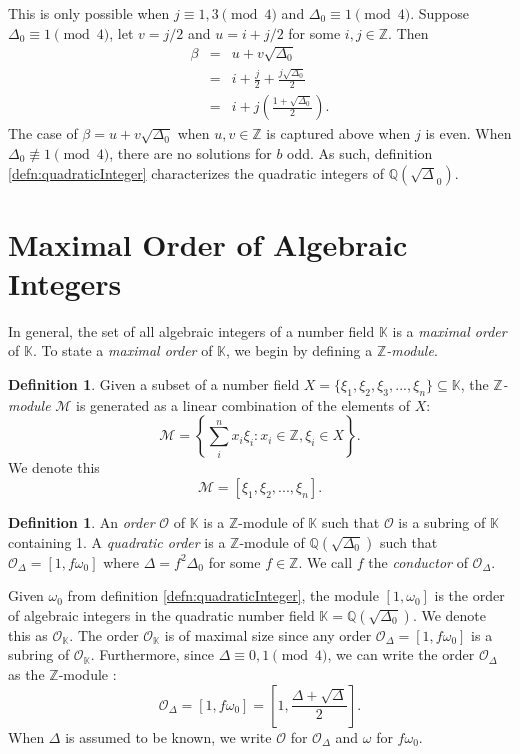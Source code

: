 \documentclass{ucalgthes1}
\theoremstyle{plain}
\theoremstyle{definition}
\newtheorem{defn}[thm]{Definition}
\newcommand{\KK}{\mathbb{K}}
\newcommand{\MM}{\mathcal{M}}
\newcommand{\OO}{\mathcal{O}}
\newcommand{\ZZ}{\mathbb{Z}}
\newcommand{\QQ}{\mathbb{Q}}
\begin{document}
\noindent
This is only possible when $j \equiv 1,3 \pmod 4$ and $\Delta_0 \equiv 1 \pmod 4$.  Suppose \break $\Delta_0 \equiv 1 \pmod 4$, let $v = j/2$ and $u = i + j/2$ for some $i, j \in \ZZ$.  Then
\begin{eqnarray*}
	\beta & = & u + v \sqrt{\Delta_0} \\
	& = & i + \frac{j}{2} + \frac{j \sqrt{\Delta_0}}{2} \\
	& = & i + j \left( \frac{1 + \sqrt{\Delta_0}}{2} \right).
\end{eqnarray*}
The case of $\beta = u + v \sqrt{\Delta_0}$ when $u,v \in \ZZ$ is captured above when $j$ is even. When $\Delta_0 \not \equiv 1 \pmod 4$, there are no solutions for $b$ odd.  As such, definition \ref{defn:quadraticInteger} characterizes the quadratic integers of $\QQ(\sqrt\Delta_0)$.



\bigbreak
\section{Maximal Order of Algebraic Integers}
In general, the set of all algebraic integers of a number field $\KK$ is a \emph{maximal order} of $\KK$.  To state a \emph{maximal order} of $\KK$, we begin by defining a \emph{$\ZZ$-module}.  

\begin{defn}
Given a subset of a number field $X = \{ \xi_1, \xi_2, \xi_3, ..., \xi_n \} \subseteq \KK$, the \emph{$\ZZ$-module} $\MM$ is generated as a linear combination of the elements of $X$:
\[
	\MM = \left \{ \sum_{i}^n x_i \xi_i : x_i \in \ZZ, \xi_i \in X \right \}.
\]
We denote this
\[
	\MM = [ \xi_1, \xi_2, ..., \xi_n ].
\]
\end{defn}

\begin{defn}
An \emph{order} $\OO$ of $\KK$ is a $\ZZ$-module of $\KK$ such that $\OO$ is a subring of $\KK$ containing 1.  A \emph{quadratic order} is a $\ZZ$-module of $\QQ(\sqrt{\Delta_0})$ such that $\OO_\Delta = [1, f\omega_0]$ where $\Delta = f^2\Delta_0$ for some $f \in \ZZ$.  We call $f$ the \emph{conductor} of $\OO_\Delta$.
\end{defn}

\bigbreak
Given $\omega_0$ from definition \ref{defn:quadraticInteger}, the module $[1, \omega_0]$ is the order of algebraic integers in the quadratic number field $\KK=\QQ(\sqrt{\Delta_0})$.  We denote this as $\OO_{\KK}$.  The order $\OO_\KK$ is of maximal size since any order $\OO_\Delta = [1,f\omega_0]$ is a subring of $\OO_\KK$.  Furthermore, since $\Delta \equiv 0,1 \pmod 4$, we can write the order $\OO_\Delta$ as the $\ZZ$-module \cite[p.~81]{Jac09}:
\[
	\OO_\Delta = [1,f\omega_0] = \left[1, \frac{\Delta + \sqrt{\Delta}}{2} \right].
\]
When $\Delta$ is assumed to be known, we write $\OO$ for $\OO_\Delta$ and $\omega$ for $f\omega_0$.
\end{document}
